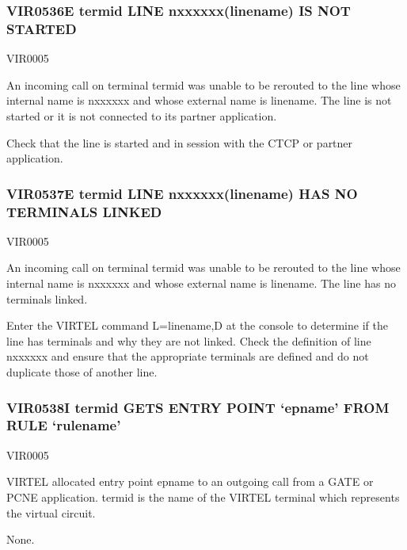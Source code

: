 \documentclass[letterpaper,10pt,english]{sphinxmanual}
\begin{document}
\subsubsection{VIR0536E termid LINE n\sphinxhyphen{}xxxxxx(linename) IS NOT STARTED}
\label{\detokenize{messages:vir0536e-termid-line-n-xxxxxx-linename-is-not-started}}\begin{description}
\sphinxAtStartPar
VIR0005

\sphinxAtStartPar
An incoming call on terminal termid was unable to be rerouted to the line whose internal name is n\sphinxhyphen{}xxxxxx and whose external name is linename. The line is not started or it is not connected to its partner application.

\sphinxAtStartPar
Check that the line is started and in session with the CTCP or partner application.

\end{description}


\subsubsection{VIR0537E termid LINE n\sphinxhyphen{}xxxxxx(linename) HAS NO TERMINALS LINKED}
\label{\detokenize{messages:vir0537e-termid-line-n-xxxxxx-linename-has-no-terminals-linked}}\begin{description}
\sphinxAtStartPar
VIR0005

\sphinxAtStartPar
An incoming call on terminal termid was unable to be rerouted to the line whose internal name is n\sphinxhyphen{}xxxxxx and whose external name is linename. The line has no terminals linked.

\sphinxAtStartPar
Enter the VIRTEL command L=linename,D at the console to determine if the line has terminals and why they are   not linked. Check the definition of line n\sphinxhyphen{}xxxxxx and ensure that the appropriate terminals are defined and do not duplicate those of another line.

\end{description}


\subsubsection{VIR0538I termid GETS ENTRY POINT ‘epname’ FROM RULE ‘rulename’}
\label{\detokenize{messages:vir0538i-termid-gets-entry-point-epname-from-rule-rulename}}\begin{description}
\sphinxAtStartPar
VIR0005

\sphinxAtStartPar
VIRTEL allocated entry point epname to an outgoing call from a GATE or PCNE application. termid is the name of the VIRTEL terminal which represents the virtual circuit.

\sphinxAtStartPar
None.

\end{description}
\end{document}
